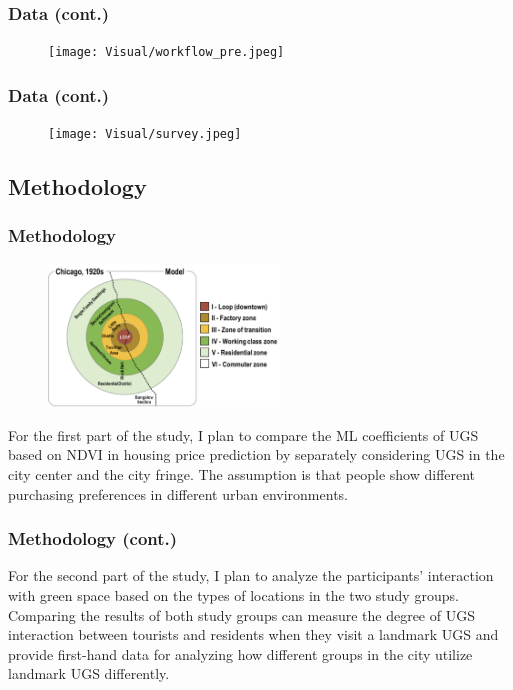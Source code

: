 \documentclass{beamer}
\begin{document}
\begin{frame}
\frametitle{Data (cont.)}
\begin{figure}[h]
  \centering
  \texttt{[image: Visual/‎workflow\_pre.jpeg]}
\end{figure}
\end{frame}

\begin{frame}
\frametitle{Data (cont.)}
\begin{figure}[h]
  \centering
  \texttt{[image: Visual/‎survey.jpeg]}
\end{figure}
\end{frame}

\subsection{Methodology}

\begin{frame}
\frametitle{Methodology}
\begin{figure}[h]
  \centering
  \includegraphics[width=0.55\textwidth]{Visual/concentric.jpg}
\end{figure}
For the first part of the study, I plan to compare the ML coefficients of UGS based on NDVI in housing price prediction by separately considering UGS in the city center and the city fringe. The assumption is that people show different purchasing preferences in different urban environments.

\end{frame}

\begin{frame}
\frametitle{Methodology (cont.)}

For the second part of the study, I plan to analyze the participants’ interaction with green space based on the types of locations in the two study groups. 
Comparing the results of both study groups can measure the degree of UGS interaction between tourists and residents when they visit a landmark UGS and provide first-hand data for analyzing how different groups in the city utilize landmark UGS differently.


\end{frame}
\end{document}
